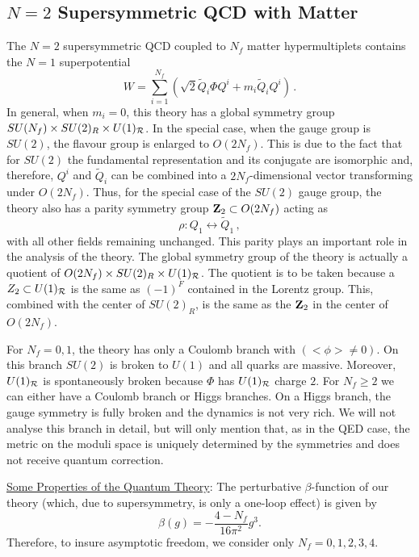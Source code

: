 \subsection{$N=2$ Supersymmetric QCD with Matter}
The $N=2$ supersymmetric QCD coupled to $N_f$ matter hypermultiplets 
contains the $N=1$ superpotential
$$
W=\sum_{i=1}^{N_f}(\sqrt{2}\widetilde{Q}_i\Phi
Q^i+m_i\tilde{Q}_iQ^i)\,. 
$$
In general, when $m_i=0$, this theory has a global symmetry group
$SU(N_f)\times SU(2)_R\times U(1)_{\cal R}$. In the special case, when
the gauge group is $SU(2)$, the flavour group is enlarged to
$O(2N_f)$. This is due to the fact that for $SU(2)$ the fundamental
representation and its conjugate are isomorphic and, therefore, $Q^i$
and $\widetilde Q_i$ can be combined into a $2N_f$-dimensional vector
transforming under $O(2N_f)$. Thus, for the special case of the
$SU(2)$ gauge group, the theory also has a parity symmetry group ${\bf
Z}_2\subset O(2N_f)$ acting as
\begin{equation}
\rho : Q_1 \leftrightarrow \widetilde{Q}_1\,,
\label{rho}
\end{equation}
with all other fields remaining unchanged. This parity plays an
important role in the analysis of the theory.  The global symmetry
group of the theory is actually a quotient of $O(2N_f) \times SU(2)_R
\times U(1)_{\cal R}$. The quotient is to be taken because a $Z_2
\subset U(1)_{\cal R}$ is the same as $(-1)^F$ contained in the
Lorentz group. This, combined with the center of $SU(2)_R$, is the
same as the ${\bf Z}_2$ in the center of $O(2N_f)$.

For $N_f = 0,1$, the theory has only a Coulomb branch with $(<\phi>
\not= 0)$. On this branch $SU(2)$ is broken to $U(1)$ and all quarks
are massive. Moreover, $U(1)_{\cal R}$ is spontaneously broken because
$\Phi$ has $U(1)_{\cal R}$ charge $2$. For $N_f \geq 2$ we can either
have a Coulomb branch or Higgs  branches. On a Higgs branch, the
gauge symmetry is fully broken and the dynamics is not very rich. We
will not analyse this branch in detail, but will only mention that, as
in the QED case, the metric on the moduli space is uniquely
determined by the symmetries and does not receive quantum correction. 

\noindent\underline{Some Properties of the Quantum Theory}: 
The perturbative $\beta$-function of our theory (which, due to
supersymmetry, is only a one-loop effect) is given by
\begin{equation}
\beta (g) = - \frac{4-N_f}{16\pi^2} g^3.
\label{betanf}
\end{equation}
Therefore, to insure asymptotic freedom, we consider only
$N_f=0,1,2,3,4$. 

